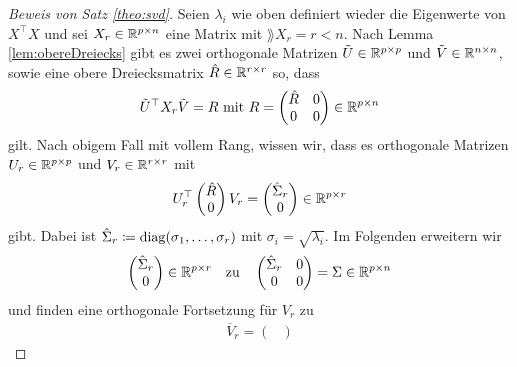 \documentclass[../Bachelor_LennartKoliwer.tex]{subfiles}
\begin{document}
\begin{proof}[Beweis von Satz \ref{theo:svd}]
	Seien $\lambda_i$ wie oben definiert wieder die Eigenwerte von $X^\top X$ und sei $X_r\in\mathbb{R}^{p\times n}$ eine Matrix mit $\rang X_r=r<n$. Nach Lemma \ref{lem:obereDreiecks} gibt es zwei orthogonale Matrizen \(\tilde{U}\in\mathbb{R}^{p\times p}\) und \(\tilde{V}\in\mathbb{R}^{n\times n}\), sowie eine obere Dreiecksmatrix $\hat{R}\in\mathbb{R}^{r\times r}$ so, dass
	\begin{align*}
		\tilde{U}^\top X_r \tilde{V}=R \text{ mit } R = \begin{pmatrix}
			                                                \hat{R} & 0 \\
			                                                0       & 0
		                                                \end{pmatrix} \in \mathbb{R}^{p\times n}
	\end{align*}
	gilt. 
	Nach obigem Fall mit vollem Rang, wissen wir, dass es orthogonale Matrizen \(U_r\in\mathbb{R}^{p\times p}\) und \(V_r\in\mathbb{R}^{r\times r}\) mit
	\begin{align*}
		U_r^\top\begin{pmatrix}
			        \hat{R} \\
			        0
		        \end{pmatrix}V_r = \begin{pmatrix}
			                           \hat{\Sigma}_r \\
			                           0
		                           \end{pmatrix}\in\mathbb{R}^{p\times r}
	\end{align*}
	gibt.
	Dabei ist $\hat{\Sigma}_r \coloneqq \operatorname{diag} (\sigma_1, \dots, \sigma_r)$ mit $\sigma_i = \sqrt{\lambda_i}$.
	Im Folgenden erweitern wir
	\begin{align*}
		\begin{pmatrix}
			\hat{\Sigma}_r \\
			0
		\end{pmatrix}\in\mathbb{R}^{p\times r} \quad\text{zu}\quad\begin{pmatrix}
			                                                   \hat{\Sigma}_r & 0 \\
			                                                   0              & 0
		                                                   \end{pmatrix}=\Sigma \in \mathbb{R}^{p\times n}
	\end{align*}
	und finden eine orthogonale Fortsetzung für $V_r$ zu
	\begin{align*}
		\overline{V}_r=\begin{pmatrix}

\end{pmatrix}
\end{align*}
\end{proof}
\end{document}
